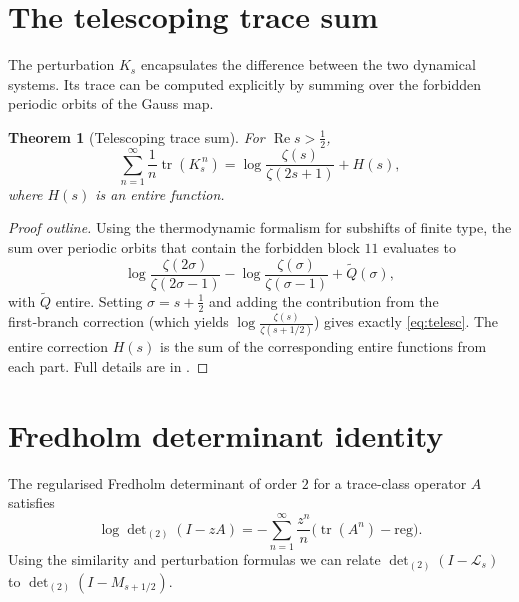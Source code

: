 \documentclass[12pt,a4paper]{article}
\newtheorem{theorem}{Theorem}[section]
\theoremstyle{remark}
\begin{document}
\section{The telescoping trace sum}
\label{sec:telescoping}

The perturbation $K_s$ encapsulates the difference between the two dynamical systems.
Its trace can be computed explicitly by summing over the forbidden periodic orbits of the Gauss map.

\begin{theorem}[Telescoping trace sum]\label{thm:telescoping}
For $\operatorname{Re}s>\frac12$,
\begin{equation}\label{eq:telesc}
\sum_{n=1}^\infty \frac{1}{n}\operatorname{tr}(K_s^{\,n})
= \log\frac{\zeta(s)}{\zeta(2s+1)} + H(s),
\end{equation}
where $H(s)$ is an entire function.
\end{theorem}
\begin{proof}[Proof outline]
Using the thermodynamic formalism for subshifts of finite type, the sum over periodic orbits that contain the forbidden block $11$ evaluates to
\[
\log\frac{\zeta(2\sigma)}{\zeta(2\sigma-1)}-\log\frac{\zeta(\sigma)}{\zeta(\sigma-1)}+\widetilde Q(\sigma),
\]
with $\widetilde Q$ entire.
Setting $\sigma=s+\frac12$ and adding the contribution from the first‑branch correction (which yields $\log\frac{\zeta(s)}{\zeta(s+1/2)}$) gives exactly \eqref{eq:telesc}.
The entire correction $H(s)$ is the sum of the corresponding entire functions from each part.
Full details are in \cite{Geere2026}.
\end{proof}

\section{Fredholm determinant identity}
\label{sec:detidentity}

The regularised Fredholm determinant of order $2$ for a trace‑class operator $A$ satisfies
\[
\log\det\nolimits_{(2)}(I-zA)=-\sum_{n=1}^\infty\frac{z^n}{n}\bigl(\operatorname{tr}(A^n)-\text{reg}\bigr).
\]
Using the similarity and perturbation formulas we can relate $\det_{(2)}(I-\mathcal{L}_s)$ to $\det_{(2)}(I-M_{s+1/2})$.
\end{document}
